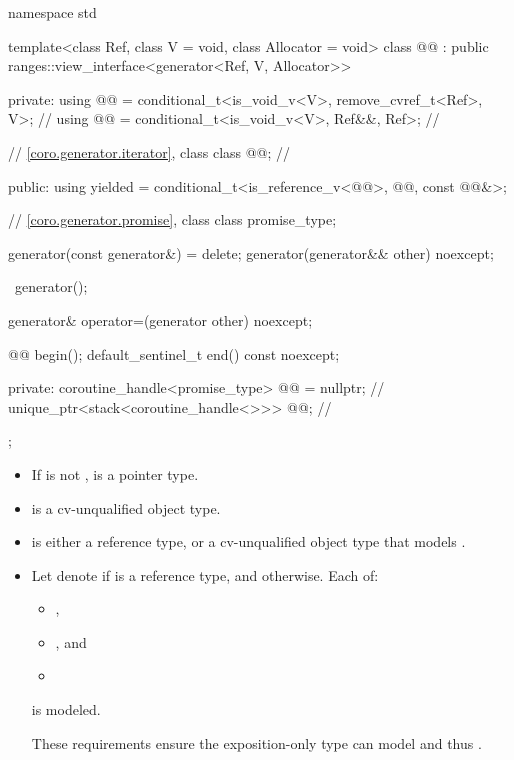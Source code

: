 \begin{codeblock}
namespace std {
  template<class Ref, class V = void, class Allocator = void>
  class @@ : public ranges::view_interface<generator<Ref, V, Allocator>> {
  private:
    using @@ = conditional_t<is_void_v<V>, remove_cvref_t<Ref>, V>;  // \expos
    using @@ = conditional_t<is_void_v<V>, Ref&&, Ref>;          // \expos

    // \ref{coro.generator.iterator}, class 
    class @@;                                                     // \expos

  public:
    using yielded =
      conditional_t<is_reference_v<@@>, @@, const @@&>;

    // \ref{coro.generator.promise}, class 
    class promise_type;

    generator(const generator&) = delete;
    generator(generator&& other) noexcept;

    ~generator();

    generator& operator=(generator other) noexcept;

    @@ begin();
    default_sentinel_t end() const noexcept;

  private:
    coroutine_handle<promise_type> @@ = nullptr;  // \expos
    unique_ptr<stack<coroutine_handle<>>> @@;        // \expos
  };
}
\end{codeblock}

\pnum
\mandates
\begin{itemize}
\item
If  is not ,
 is a pointer type.
\item
{} is a cv-unqualified object type.
\item
{} is either a reference type, or
a cv-unqualified object type that models .
\item
Let  denote 
if  is a reference type,
and  otherwise.
Each of:
\begin{itemize}
\item {},
\item {}, and
\item {}
\end{itemize}
is modeled.
\begin{note}
These requirements ensure the exposition-only  type
can model  and thus .
\end{note}
\end{itemize}

